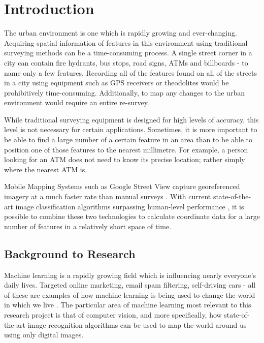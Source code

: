 \chapter{Introduction}

\label{intro} %


\newcommand{\keyword}[1]{\textbf{#1}}
\newcommand{\tabhead}[1]{\textbf{#1}}
\newcommand{\code}[1]{\texttt{#1}}
\newcommand{\file}[1]{\texttt{\bfseries#1}}
\newcommand{\option}[1]{\texttt{\itshape#1}}

The urban environment is one which is rapidly growing and ever-changing. Acquiring spatial information of features in this environment using traditional surveying methods can be a time-consuming process. A single street corner in a city can contain fire hydrants, bus stops, road signs, ATMs and billboards - to name only a few features. Recording all of the features found on all of the streets in a city using equipment such as GPS receivers or theodolites would be prohibitively time-consuming. Additionally, to map any changes to the urban environment would require an entire re-survey.

While traditional surveying equipment is designed for high levels of accuracy, this level is not necessary for certain applications. Sometimes, it is more important to be able to find a large number of a certain feature in an area than to be able to position one of those features to the nearest millimetre. For example, a person looking for an ATM does not need to know its precise location; rather simply where the nearest ATM is.

Mobile Mapping Systems such as Google Street View capture georeferenced imagery at a much faster rate than manual surveys \parencite{ref2.9}. With current state-of-the-art image classification algorithms surpassing human-level performance \parencite{convolution1}, it is possible to combine these two technologies to calculate coordinate data for a large number of features in a relatively short space of time.

\section{Background to Research}
Machine learning is a rapidly growing field which is influencing nearly everyone's daily lives. Targeted online marketing, email spam filtering, self-driving cars - all of these are examples of how machine learning is being used to change the world in which we live \parencite{ref1.1}.
The particular area of machine learning most relevant to this research project is that of computer vision, and more specifically, how state-of-the-art image recognition algorithms can be used to map the world around us using only digital images.

